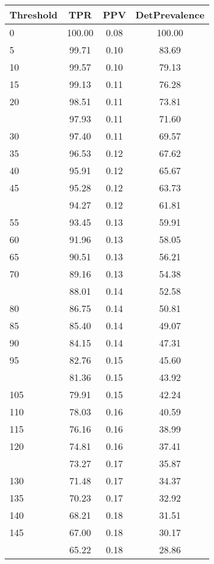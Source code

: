 \begin{table}[ht]
\centering
\begin{tabular}{lccc}
  \toprule
Threshold & TPR & PPV & DetPrevalence \\ 
  \midrule
0 & 100.00 & 0.08 & 100.00 \\ 
  5 & 99.71 & 0.10 & 83.69 \\ 
  10 & 99.57 & 0.10 & 79.13 \\ 
  15 & 99.13 & 0.11 & 76.28 \\ 
  20 & 98.51 & 0.11 & 73.81 \\ 
   \addlinespace
25 & 97.93 & 0.11 & 71.60 \\ 
  30 & 97.40 & 0.11 & 69.57 \\ 
  35 & 96.53 & 0.12 & 67.62 \\ 
  40 & 95.91 & 0.12 & 65.67 \\ 
  45 & 95.28 & 0.12 & 63.73 \\ 
   \addlinespace
50 & 94.27 & 0.12 & 61.81 \\ 
  55 & 93.45 & 0.13 & 59.91 \\ 
  60 & 91.96 & 0.13 & 58.05 \\ 
  65 & 90.51 & 0.13 & 56.21 \\ 
  70 & 89.16 & 0.13 & 54.38 \\ 
   \addlinespace
75 & 88.01 & 0.14 & 52.58 \\ 
  80 & 86.75 & 0.14 & 50.81 \\ 
  85 & 85.40 & 0.14 & 49.07 \\ 
  90 & 84.15 & 0.14 & 47.31 \\ 
  95 & 82.76 & 0.15 & 45.60 \\ 
   \addlinespace
100 & 81.36 & 0.15 & 43.92 \\ 
  105 & 79.91 & 0.15 & 42.24 \\ 
  110 & 78.03 & 0.16 & 40.59 \\ 
  115 & 76.16 & 0.16 & 38.99 \\ 
  120 & 74.81 & 0.16 & 37.41 \\ 
   \addlinespace
125 & 73.27 & 0.17 & 35.87 \\ 
  130 & 71.48 & 0.17 & 34.37 \\ 
  135 & 70.23 & 0.17 & 32.92 \\ 
  140 & 68.21 & 0.18 & 31.51 \\ 
  145 & 67.00 & 0.18 & 30.17 \\ 
   \addlinespace
150 & 65.22 & 0.18 & 28.86 \\ 

\end{tabular}
\end{table}
